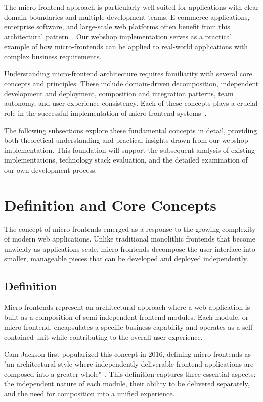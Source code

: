 \documentclass[12pt,a4paper]{report}
\begin{document}
The micro-frontend approach is particularly well-suited for applications with clear domain boundaries and multiple development teams. E-commerce applications, enterprise software, and large-scale web platforms often benefit from this architectural pattern~\cite{mezzalira2021building}. Our webshop implementation serves as a practical example of how micro-frontends can be applied to real-world applications with complex business requirements.

Understanding micro-frontend architecture requires familiarity with several core concepts and principles. These include domain-driven decomposition, independent development and deployment, composition and integration patterns, team autonomy, and user experience consistency. Each of these concepts plays a crucial role in the successful implementation of micro-frontend systems~\cite{geers2019microfrontends, mezzalira2021building}.

The following subsections explore these fundamental concepts in detail, providing both theoretical understanding and practical insights drawn from our webshop implementation. This foundation will support the subsequent analysis of existing implementations, technology stack evaluation, and the detailed examination of our own development process.
\section{Definition and Core Concepts}

The concept of micro-frontends emerged as a response to the growing complexity of modern web applications. Unlike traditional monolithic frontends that become unwieldy as applications scale, micro-frontends decompose the user interface into smaller, manageable pieces that can be developed and deployed independently.

\subsection*{Definition}

Micro-frontends represent an architectural approach where a web application is built as a composition of semi-independent frontend modules. Each module, or micro-frontend, encapsulates a specific business capability and operates as a self-contained unit while contributing to the overall user experience.

Cam Jackson first popularized this concept in 2016, defining micro-frontends as "an architectural style where independently deliverable frontend applications are composed into a greater whole"~\cite{jackson2016microfrontends}. This definition captures three essential aspects: the independent nature of each module, their ability to be delivered separately, and the need for composition into a unified experience.
\end{document}
